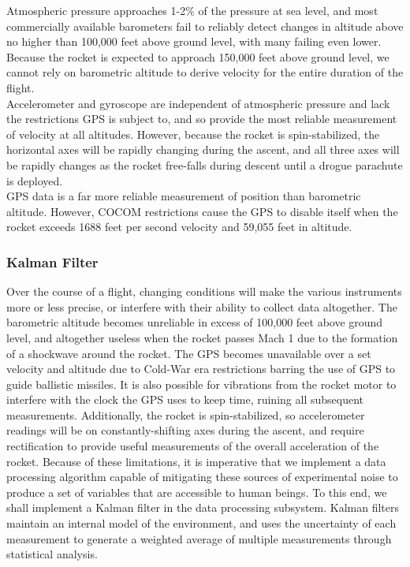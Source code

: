 \documentclass[journal,10pt,onecolumn,compsoc]{IEEEtran}
\begin{document}
				\noindent Atmospheric pressure approaches 1-2\% of the pressure at sea level, and most commercially available barometers fail to reliably detect changes in altitude above no higher than 100,000 feet above ground level, with many failing even lower.
				Because the rocket is expected to approach 150,000 feet above ground level, we cannot rely on barometric altitude to derive velocity for the entire duration of the flight.\\

				\noindent Accelerometer and gyroscope are independent of atmospheric pressure and lack the restrictions GPS is subject to, and so provide the most reliable measurement of velocity at all altitudes.
				However, because the rocket is spin-stabilized, the horizontal axes will be rapidly changing during the ascent, and all three axes will be rapidly changes as the rocket free-falls during descent until a drogue parachute is deployed.\\

				\noindent GPS data is a far more reliable measurement of position than barometric altitude.
				However, COCOM restrictions cause the GPS to disable itself when the rocket exceeds 1688 feet per second velocity and 59,055 feet in altitude.
				
		\subsubsection{Kalman Filter}
			\noindent Over the course of a flight, changing conditions will make the various instruments more or less precise, or interfere with their ability to collect data altogether.
			The barometric altitude becomes unreliable in excess of 100,000 feet above ground level, and altogether useless when the rocket passes Mach 1 due to the formation of a shockwave around the rocket.
			The GPS becomes unavailable over a set velocity and altitude due to Cold-War era restrictions barring the use of GPS to guide ballistic missiles.
			It is also possible for vibrations from the rocket motor to interfere with the clock the GPS uses to keep time, ruining all subsequent measurements.
			Additionally, the rocket is spin-stabilized, so accelerometer readings will be on constantly-shifting axes during the ascent, and require rectification to provide useful measurements of the overall acceleration of the rocket.
			Because of these limitations, it is imperative that we implement a data processing algorithm capable of mitigating these sources of experimental noise to produce a set of variables that are accessible to human beings.
			To this end, we shall implement a Kalman filter in the data processing subsystem.
			Kalman filters maintain an internal model of the environment, and uses the uncertainty of each measurement to generate a weighted average of multiple measurements through statistical analysis.
			
\end{document}
